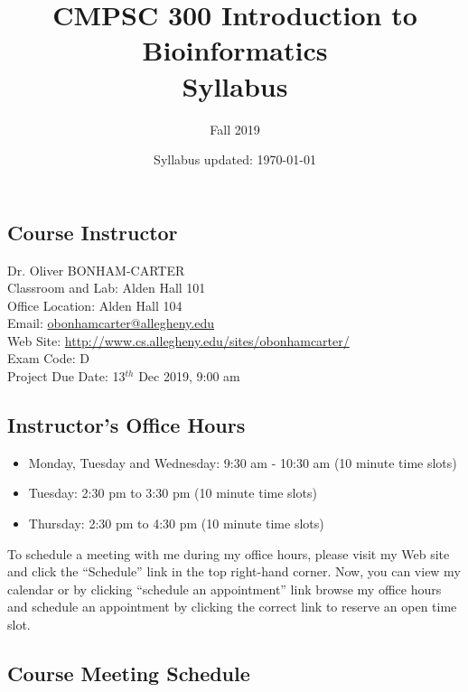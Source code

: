 \documentclass[11pt]{article} %
\title{\textbf{CMPSC 300 Introduction to Bioinformatics\\Syllabus}}
\author{Fall 2019}
\date{Syllabus updated: \today} %
\begin{document}
\maketitle

\subsection*{\textbf{Course Instructor}}
Dr. Oliver BONHAM-CARTER\\
\noindent Classroom and Lab: Alden Hall 101 \\
\noindent Office Location: Alden Hall 104 \\
\noindent Email: \url{obonhamcarter@allegheny.edu} \\
\noindent Web Site: \url{http://www.cs.allegheny.edu/sites/obonhamcarter/} \\
\noindent Exam Code: D\\
\noindent Project Due Date: 13$^{th}$ Dec 2019, 9:00 am

\subsection*{\textbf{Instructor's Office Hours}}

\begin{itemize}
	\itemsep 0em
        \item Monday, Tuesday and Wednesday: 9:30 am - 10:30 am (10 minute time slots)
        \item Tuesday: 2:30 pm to 3:30 pm (10 minute time slots)
        \item Thursday: 2:30 pm to 4:30 pm (10 minute time slots)
\end{itemize}

\noindent
To schedule a meeting with me during my office hours, please visit my Web site and click the ``Schedule'' link in the top right-hand corner. Now, you can view my calendar or by clicking ``schedule an appointment'' link browse my office hours and schedule an appointment by clicking the correct link to reserve an open time slot. 


\subsection*{\textbf{Course Meeting Schedule}}
\end{document}
